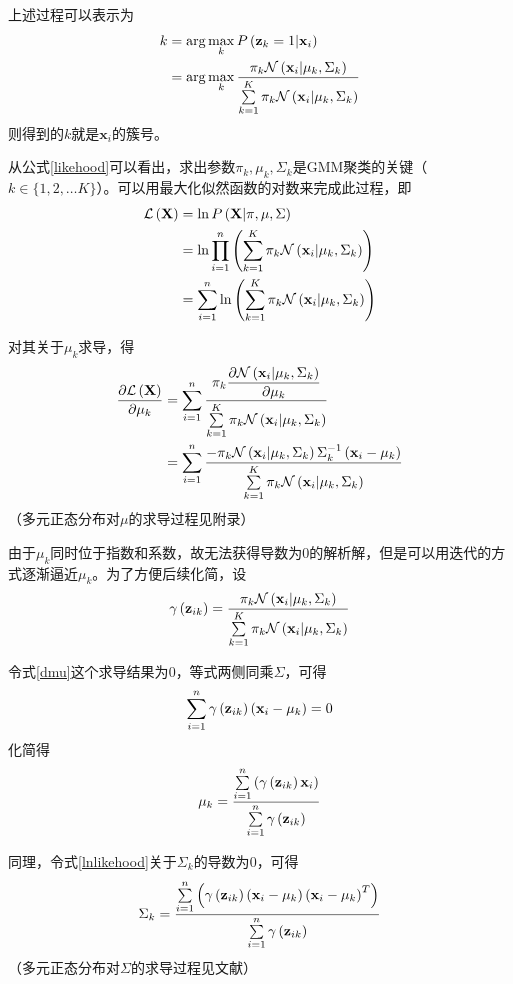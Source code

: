 上述过程可以表示为
\begin{align}
    k
    &= \arg\max_k P\left(\mathbf{z}_k=1|\mathbf{x}_i\right) \\
    \label{likehood}
    &= \arg\max_k \dfrac{\pi_k\gauss}{\sumk\pi_k\gauss}
\end{align}
则得到的$k$就是$\mathbf{x}_i$的簇号。

从公式\ref{likehood}可以看出，求出参数$\pi_k, \mu_k, \Sigma_k$是GMM聚类的关键（$k\in \{1, 2, \ldots K\}$）。可以用最大化似然函数的对数来完成此过程，即
\begin{align}
    \mathcal{L}\left(\mathbf{X}\right)
    &= \ln P\left(\mathbf{X}|\pi, \mu, \Sigma\right) \\
    &= \ln\prod^n_{i=1}\left(\sumk\pi_k\gauss\right) \\
    \label{lnlikehood}
    &= \sumn\ln\left(\sumk\pi_k\gauss\right)
\end{align}

对其关于$\mu_k$求导，得
\begin{align}
    \dfrac{\partial\mathcal{L}\left(\mathbf{X}\right)}{\partial\mu_k}
    &= \sumn\dfrac{\pi_k\dfrac{\partial\gauss}{\partial\mu_k}}{\sumk\pi_k\gauss} \\
    \label{dmu}
    &= \sumn\dfrac{-\pi_k\gauss\Sigma^{-1}_k\left(\mathbf{x}_i-\mu_k\right)}{\sumk\pi_k\gauss}
\end{align}
（多元正态分布对$\mu$的求导过程见附录）

由于$\mu_k$同时位于指数和系数，故无法获得导数为$0$的解析解，但是可以用迭代的方式逐渐逼近$\mu_k$。为了方便后续化简，设
\begin{equation}
    \label{gamma}
    \gammaz{k}=\dfrac{\pi_k\gauss}{\sumk\pi_k\gauss}
\end{equation}

令式\ref{dmu}这个求导结果为$0$，等式两侧同乘$\Sigma$，可得
\begin{equation}
    \sum\limits^n_{i=1}\gamma\left(\mathbf{z}_{i {k}}\right)\left(\mathbf{x}_i-\mu_k\right)=0
\end{equation}
化简得
\begin{equation}
    \label{mu}
    \mu_k=\dfrac{\sumn\left(\gammaz{k}\mathbf{x}_i\right)}{\sumn\gammaz{k}}
\end{equation}

同理，令式\ref{lnlikehood}关于$\Sigma_k$的导数为$0$，可得
\begin{equation}
    \label{Sigma}
    \Sigma_k=\dfrac{\sumn\left(\gammaz{k}\left(\mathbf{x}_i-\mu_k\right)\left(\mathbf{x}_i-\mu_k\right)^T\right)}{\sumn\gammaz{k}}
\end{equation}
（多元正态分布对$\Sigma$的求导过程见文献\cite{PRML}）

